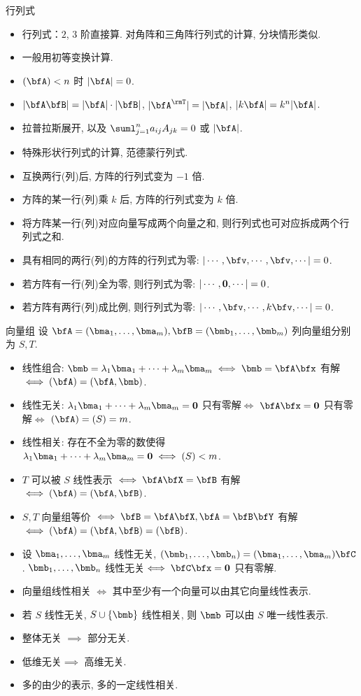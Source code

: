 \documentclass[aspectratio=169,handout]{ctexbeamer}
\let\rank\relax\DeclareMathOperator\rank{R}
\begin{document}
\begin{frame}{行列式}
	\onslide<+->
	\begin{itemize}
		\item 行列式：$2$, $3$ 阶直接算. 对角阵和三角阵行列式的计算, 分块情形类似.
		\item 一般用初等变换计算.
		\item $\rank(\bfA)<n$ 时 $|\bfA|=0$.
		\item $|\bfA\bfB|=|\bfA|\cdot|\bfB|$, $|\bfA^\rmT|=|\bfA|$, $|k\bfA|=k^n|\bfA|$.
		\item 拉普拉斯展开, 以及 $\suml_{j=1}^n a_{ij}A_{jk}=0$ 或 $|\bfA|$.
		\item 特殊形状行列式的计算, 范德蒙行列式.
		\item 互换两行(列)后, 方阵的行列式变为 $-1$ 倍.
		\item 方阵的某一行(列)乘 $k$ 后, 方阵的行列式变为 $k$ 倍.
		\item 将方阵某一行(列)对应向量写成两个向量之和, 则行列式也可对应拆成两个行列式之和.
		\item 具有相同的两行(列)的方阵的行列式为零: $|\cdots,\bfv,\cdots,\bfv,\cdots|=0$.
		\item 若方阵有一行(列)全为零, 则行列式为零: $|\cdots,{\bf0},\cdots|=0$.
		\item 若方阵有两行(列)成比例, 则行列式为零: $|\cdots,\bfv,\cdots,k\bfv,\cdots|=0$.
	\end{itemize}
\end{frame}


\begin{frame}{向量组}
	\onslide<+->
	设 $\bfA=(\bma_1,\dots,\bma_m),\bfB=(\bmb_1,\dots,\bmb_m)$ 列向量组分别为 $S,T$.
	\begin{itemize}
		\item 线性组合: $\bmb=\lambda_1\bma_1+\cdots+\lambda_m\bma_m\iff \bmb=\bfA\bfx$ 有解 $\iff \rank(\bfA)=\rank(\bfA,\bmb)$.
		\item 线性无关: $\lambda_1\bma_1+\cdots+\lambda_m\bma_m={\bf0}$ 只有零解$\iff$
		$\bfA\bfx={\bf0}$ 只有零解$\iff$ $\rank(\bfA)=\rank(S)=m$.
		\item 线性相关: 存在不全为零的数使得 $\lambda_1\bma_1+\cdots+\lambda_m\bma_m={\bf0} \iff \rank(S)<m$.
		\item $T$ 可以被 $S$ 线性表示 $\iff \bfA\bfX=\bfB$ 有解 $\iff \rank(\bfA)=\rank(\bfA,\bfB)$.
		\item $S,T$ 向量组等价 $\iff \bfB=\bfA\bfX,\bfA=\bfB\bfY $ 有解 $\iff \rank(\bfA)=\rank(\bfA,\bfB)=\rank(\bfB)$.
		\item 设 $\bma_1,\dots,\bma_m$ 线性无关, $(\bmb_1,\dots,\bmb_n)=(\bma_1,\dots,\bma_m)\bfC$. 
		$\bmb_1,\dots,\bmb_n$ 线性无关$\iff \bfC\bfx={\bf0}$ 只有零解.
		\item 向量组线性相关 $\iff$ 其中至少有一个向量可以由其它向量线性表示.
		\item 若 $S$ 线性无关, $S\cup\{\bmb\}$ 线性相关, 则 $\bmb$ 可以由 $S$ 唯一线性表示.
		\item 整体无关 $\implies$ 部分无关.
		\item 低维无关$\implies$ 高维无关.
		\item 多的由少的表示, 多的一定线性相关.
	\end{itemize}
\end{frame}
\end{document}
